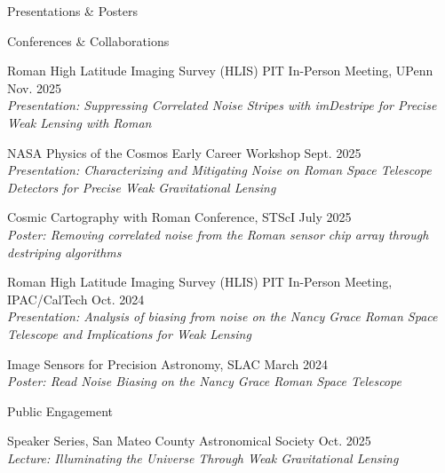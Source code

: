 \documentclass{resume} %
\begin{document}
\begin{rSection}{Presentations \& Posters}
\vspace{.3em}
\begin{rSubsection}{Conferences \& Collaborations}{}{}{}
\vspace{.3em}

\item Roman High Latitude Imaging Survey (HLIS) PIT In-Person Meeting, UPenn \hfill{Nov. 2025}
\\ \small{\textit{Presentation: Suppressing Correlated Noise Stripes with imDestripe for Precise Weak Lensing with Roman}}
\\
\item NASA Physics of the Cosmos Early Career Workshop \hfill {Sept. 2025}
\\ \small{\textit{Presentation: Characterizing and Mitigating Noise on Roman Space Telescope Detectors for Precise Weak Gravitational Lensing}}
\\
\item Cosmic Cartography with Roman Conference, STScI \hfill {July 2025}
\\ \small{\textit{Poster: Removing correlated noise from the Roman sensor chip array through destriping algorithms}}
\\
\item Roman High Latitude Imaging Survey (HLIS) PIT In-Person Meeting, IPAC/CalTech \hfill{Oct. 2024}
\\ \small{\textit{Presentation: Analysis of biasing from noise on the Nancy Grace Roman Space Telescope and Implications for Weak Lensing }}
\\
\item Image Sensors for Precision Astronomy, SLAC \hfill {March 2024}
\\ \small{\textit{Poster: Read Noise Biasing on the Nancy Grace Roman Space Telescope}}
\end{rSubsection}

\begin{rSubsection}{Public Engagement}{}{}{}
\vspace{.3em}
\item Speaker Series, San Mateo County Astronomical Society \hfill{Oct. 2025}
\\ \small{\textit{Lecture: Illuminating the Universe Through Weak Gravitational Lensing}}
\end{rSubsection}

\end{rSection}
\end{document}
